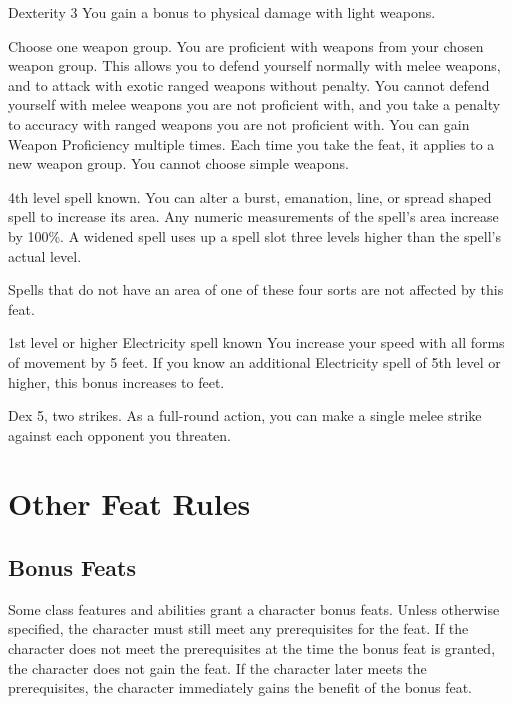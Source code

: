 \featpres Dexterity 3
\featben You gain a  bonus to physical damage with light weapons.

Choose one weapon group.
\featben You are proficient with weapons from your chosen weapon group.
This allows you to defend yourself normally with melee weapons, and to attack with exotic ranged weapons without penalty.
You cannot defend yourself with melee weapons you are not proficient with, and you take a  penalty to accuracy with ranged weapons you are not proficient with.
You can gain Weapon Proficiency multiple times.
Each time you take the feat, it applies to a new weapon group.
You cannot choose simple weapons.

\featpre 4th level spell known.
\featben You can alter a burst, emanation, line, or spread shaped spell to increase its area.
Any numeric measurements of the spell's area increase by 100\%.
A widened spell uses up a spell slot three levels higher than the spell's actual level.
\par Spells that do not have an area of one of these four sorts are not affected by this feat.

\featpre 1st level or higher Electricity spell known
\featben You increase your speed with all forms of movement by 5 feet.
If you know an additional Electricity spell of 5th level or higher, this bonus increases to  feet.

\featpres Dex 5, two strikes.
\featben As a full-round action, you can make a single melee strike against each opponent you threaten.

\section{Other Feat Rules}

\subsection{Bonus Feats}
Some class features and abilities grant a character bonus feats.
Unless otherwise specified, the character must still meet any prerequisites for the feat.
If the character does not meet the prerequisites at the time the bonus feat is granted, the character does not gain the feat.
If the character later meets the prerequisites, the character immediately gains the benefit of the bonus feat.

